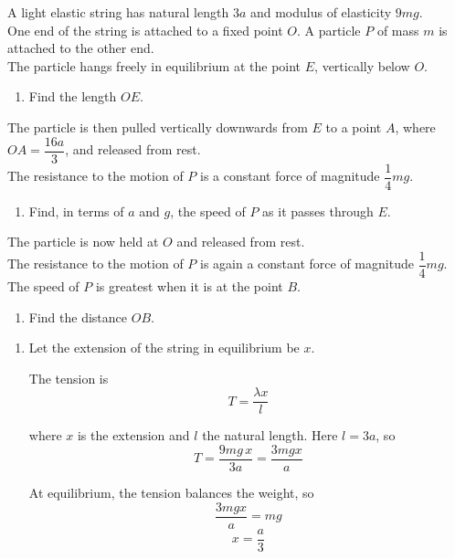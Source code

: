 \documentclass[leqno]{article}
\begin{document}
\begin{enumerate}[
  label=\textbf{\arabic*.},
  leftmargin=*,
  topsep=0pt,
  partopsep=0pt,
  parsep=0pt
]
A light elastic string has natural length $3a$ and modulus of elasticity $9mg$. \\
One end of the string is attached to a fixed point $O$. A particle $P$ of mass $m$ is attached to the other end. \\
The particle hangs freely in equilibrium at the point $E$, vertically below $O$. \\
\begin{enumerate}[label=\textbf{(\alph*)}]
  \item Find the length $OE$.  \\
\end{enumerate}
The particle is then pulled vertically downwards from $E$ to a point $A$, where $OA = \dfrac{16a}{3}$, and released from rest. \\
The resistance to the motion of $P$ is a constant force of magnitude $\dfrac{1}{4}mg$. \\
\begin{enumerate}[label=\textbf{(\alph*)}, resume]
  \item Find, in terms of $a$ and $g$, the speed of $P$ as it passes through $E$.  \\
\end{enumerate}
The particle is now held at $O$ and released from rest. \\
The resistance to the motion of $P$ is again a constant force of magnitude $\dfrac{1}{4}mg$. \\
The speed of $P$ is greatest when it is at the point $B$. \\
\begin{enumerate}[label=\textbf{(\alph*)}, resume]
  \item Find the distance $OB$.  \\
\end{enumerate}

\vspace*{10pt}

\begin{djsSolution}
\begin{enumerate}[label=\textbf{(\alph*)}, start=1]
  \item Let the extension of the string in equilibrium be \(x\).

The tension is
\[
T=\frac{\lambda x}{l}
\]

where \(x\) is the extension and \(l\) the natural length. Here \(l=3a\), so
\[
T=\frac{9mg\,x}{3a}=\frac{3mgx}{a}
\]

At equilibrium, the tension balances the weight, so
\[
\frac{3mgx}{a}=mg
\]
\[
x=\frac{a}{3}
\]


\end{enumerate}
\end{djsSolution}
\end{enumerate}
\end{document}
